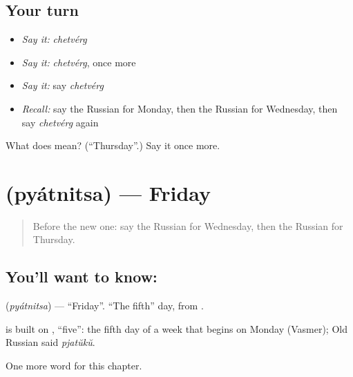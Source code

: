 \subsection*{Your turn}
\begin{itemize}
\raggedright
  \item \emph{Say it:} \emph{chetvérg}
  \item \emph{Say it:} \emph{chetvérg}, once more
  \item \emph{Say it:} say \emph{chetvérg}
  \item \emph{Recall:} say the Russian for Monday, then the Russian for Wednesday, then say \emph{chetvérg} again
\end{itemize}

\begin{tcolorbox}[breakable,colback=teal!4,colframe=teal!35!black,title={Before you move on}]
What does  mean? (\textquotedblleft{}Thursday\textquotedblright{}.) Say it once more.
\end{tcolorbox}
\section[\texorpdfstring{\ru{пятница} (pyátnitsa)}{пятница (pyátnitsa)}]{ (pyátnitsa) — Friday}

\label{lesson:RU-C70-friday}



\begin{quote}
Before the new one: say the Russian for Wednesday, then the Russian for Thursday.
\end{quote}

\subsection*{You'll want to know: }
\textbf{} (\emph{pyátnitsa}) — \textquotedblleft{}Friday\textquotedblright{}. \textquotedblleft{}The fifth\textquotedblright{} day, from \textbf{}.

\begin{cousinweb}
\textbf{} is built on \emph{}, \textquotedblleft{}five\textquotedblright{}: the fifth day of a week that begins on Monday (Vasmer); Old Russian said \emph{pjatŭkŭ}.
\end{cousinweb}

\begin{grammarlens}[title={What you've built}]
One more word for this chapter.
\end{grammarlens}

